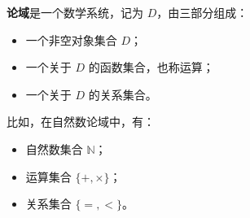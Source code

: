 \begin{definition}[论域]
    \textbf{论域}是一个数学系统，记为 $D$，由三部分组成：
    \begin{itemize}
        \item 一个非空对象集合 $D$；
        \item 一个关于 $D$ 的函数集合，也称运算；
        \item 一个关于 $D$ 的关系集合。
    \end{itemize}
\end{definition}

比如，在自然数论域中，有：

\begin{itemize}
    \item 自然数集合 $\mathbb{N}$；
    \item 运算集合 $\{+, \times\}$；
    \item 关系集合 $\{=, <\}$。
\end{itemize}
